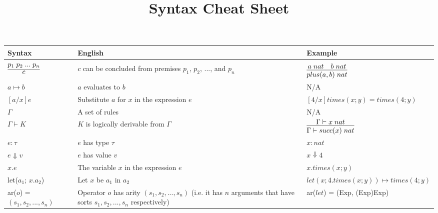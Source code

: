\documentclass[12pt]{article}
\begin{document}
 
\title{Syntax Cheat Sheet}
 
\maketitle

\renewcommand{\arraystretch}{2.0}

\begin{tabular}{l | p{6cm} | p{6cm} }
	\bf{Syntax} & \bf{English} & \bf{Example} \\
	\hline & & \\

	$\infer{c}{p_1 \; p_2 \; ... \; p_n}$ & $c$ can be concluded from premises $p_1$, $p_2$, ..., and $p_n$ & $\infer{plus(a,b) \; nat}{a\; nat \quad b \; nat}$\\

	$a \mapsto b$ & $a$ evaluates to $b$ &  N/A\\

	$[a/x]e$ & Substitute $a$ for $x$ in the expression $e$ & $[4/x]times(x; y) = times(4; y)$\\

	$\Gamma$ & A set of rules & N/A \\

	$\Gamma \vdash K$ & $K$ is logically derivable from $\Gamma$ & $\infer{\Gamma \vdash succ(x) \; nat}{\Gamma \vdash x \; nat}$ \\
	$e : \tau$ & $e$ has type $\tau$ & $x : nat$ \\

	$e \Downarrow v$ & $e$ has value $v$ & $x \Downarrow 4$ \\

	$x.e$ & The variable $x$ in the expression $e$ & $x.times(x;y)$ \\

	let($a_1$; $x.a_2$) & Let $x$ be $a_1$ in $a_2$ & $let(x; 4 . times(x; y)) \mapsto times(4; y)$ \\

	ar($o$) = $(s_1, s_2, ..., s_n)$ & Operator $o$ has arity $(s_1, s_2, ..., s_n)$ (i.e. it has $n$ arguments that have sorts $s_1, s_2, ..., s_n$ respectively) & ar($let$) = (Exp, (Exp)Exp) \\


\end{tabular}
\end{document}

